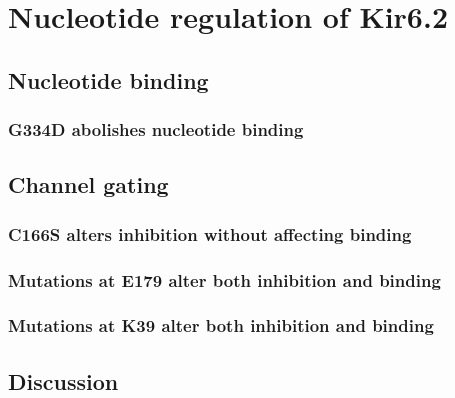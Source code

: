 \chapter{\label{ch:5}Nucleotide regulation of Kir6.2} 

\graphicspath{{figures/ch5/}}

\minitoc

\section{Nucleotide binding}

\subsection{G334D abolishes nucleotide binding}

\section{Channel gating}

\subsection{C166S alters inhibition without affecting binding}

\subsection{Mutations at E179 alter both inhibition and binding}

\subsection{Mutations at K39 alter both inhibition and binding}

\section{Discussion}